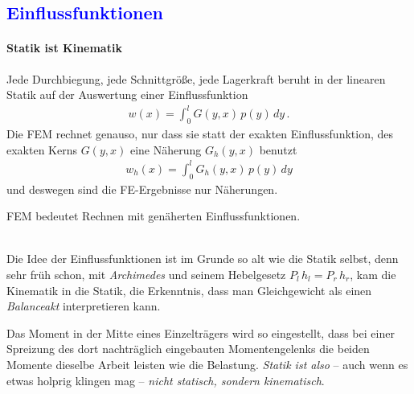 {\textcolor{blue}{\chapter{Einflussfunktionen}}}

{\textcolor{sectionTitleBlue}{\subsubsection*{Statik ist Kinematik}}}

Jede Durchbiegung, jede Schnittgr\"{o}{\ss}e, jede Lagerkraft beruht in der linearen Statik auf der Auswertung einer Einflussfunktion
\begin{align}
w(x) = \int_{0}^{l} G(y,x)\,p(y)\,dy\,.
\end{align}
Die FEM rechnet genauso, nur dass sie statt der exakten Einflussfunktion, des exakten Kerns $G(y,x)$ eine N\"{a}herung $G_h(y,x)$ benutzt
\begin{align}
w_h(x) = \int_{0}^{l} G_h(y,x)\,p(y)\,dy
\end{align}
und deswegen sind die FE-Ergebnisse nur N\"{a}herungen.\\

\hspace*{-12pt}\colorbox{highlightBlue}{\parbox{0.98\textwidth}{ FEM bedeutet Rechnen mit gen\"{a}herten Einflussfunktionen. }}\\

Die Idee der Einflussfunktionen ist im Grunde so alt wie die Statik selbst, denn sehr fr\"{u}h schon, mit {\em Archimedes\/} und seinem Hebelgesetz $ P_l \, h_l = P_r \, h_r$, kam die Kinematik in die Statik, die Erkenntnis, dass man Gleichgewicht als einen {\em Balanceakt\/} interpretieren kann.


Das Moment in der Mitte eines Einzeltr\"{a}gers wird so eingestellt, dass bei einer Spreizung des dort nachtr\"{a}glich eingebauten Momentengelenks die beiden Momente dieselbe Arbeit leisten wie die Belastung. {\em Statik ist also} -- auch wenn es etwas holprig klingen mag -- {\em nicht statisch, sondern kinematisch\/}.


